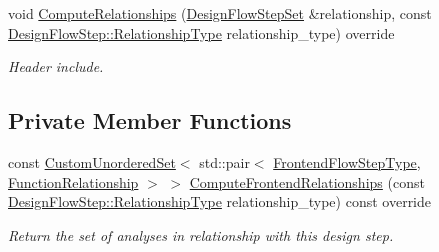 \begin{DoxyCompactItemize}
void \hyperlink{classBuildVirtualPhi_a91ad5ae49dfe85e06f47e88df0dab90d}{Compute\+Relationships} (\hyperlink{classDesignFlowStepSet}{Design\+Flow\+Step\+Set} \&relationship, const \hyperlink{classDesignFlowStep_a723a3baf19ff2ceb77bc13e099d0b1b7}{Design\+Flow\+Step\+::\+Relationship\+Type} relationship\+\_\+type) override
\begin{DoxyCompactList}\small\item\em Header include. \end{DoxyCompactList}\end{DoxyCompactItemize}
\subsection*{Private Member Functions}
\begin{DoxyCompactItemize}
\item 
const \hyperlink{classCustomUnorderedSet}{Custom\+Unordered\+Set}$<$ std\+::pair$<$ \hyperlink{frontend__flow__step_8hpp_afeb3716c693d2b2e4ed3e6d04c3b63bb}{Frontend\+Flow\+Step\+Type}, \hyperlink{classFrontendFlowStep_af7cf30f2023e5b99e637dc2058289ab0}{Function\+Relationship} $>$ $>$ \hyperlink{classBuildVirtualPhi_ace3b2828aa2cef219d7e6a6d04132473}{Compute\+Frontend\+Relationships} (const \hyperlink{classDesignFlowStep_a723a3baf19ff2ceb77bc13e099d0b1b7}{Design\+Flow\+Step\+::\+Relationship\+Type} relationship\+\_\+type) const override
\begin{DoxyCompactList}\small\item\em Return the set of analyses in relationship with this design step. \end{DoxyCompactList}\end{DoxyCompactItemize}
